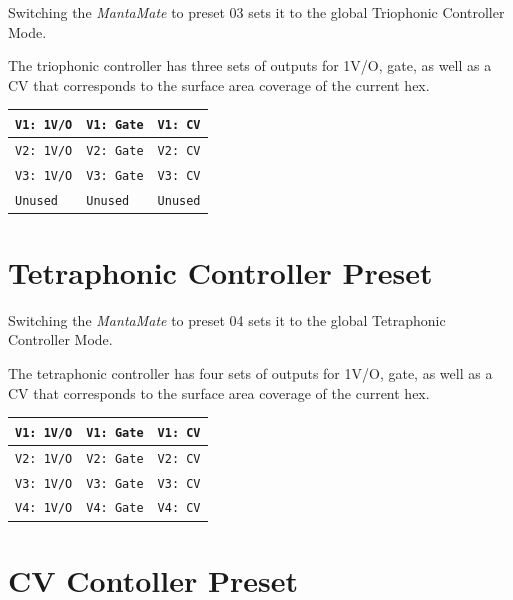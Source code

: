   Switching the \emph{MantaMate} to preset 03 sets it to the global
  Triophonic Controller Mode.

  The triophonic controller has three sets of outputs for 1V/O, gate, as well
  as a CV that corresponds to the surface area coverage of the current
  hex.

  \begin{center}
  \begin{tabular}{ | m{1.5cm} | m{1.5cm}| m{1.5cm} | }
    \hline
    \texttt{V1: 1V/O} & \texttt{V1: Gate} & \texttt{V1: CV} \\
    \hline
    \texttt{V2: 1V/O} & \texttt{V2: Gate} & \texttt{V2: CV} \\
    \hline
    \texttt{V3: 1V/O} & \texttt{V3: Gate} & \texttt{V3: CV} \\
    \hline
    \texttt{Unused} & \texttt{Unused} & \texttt{Unused} \\
    \hline
  \end{tabular}
  \end{center}


\section{Tetraphonic Controller Preset}

  Switching the \emph{MantaMate} to preset 04 sets it to the global
  Tetraphonic Controller Mode.

  The tetraphonic controller has four sets of outputs for 1V/O, gate, as well
  as a CV that corresponds to the surface area coverage of the current
  hex.

  \begin{center}
  \begin{tabular}{ | m{1.5cm} | m{1.5cm}| m{1.5cm} | }
    \hline
    \texttt{V1: 1V/O} & \texttt{V1: Gate} & \texttt{V1: CV} \\
    \hline
    \texttt{V2: 1V/O} & \texttt{V2: Gate} & \texttt{V2: CV} \\
    \hline
    \texttt{V3: 1V/O} & \texttt{V3: Gate} & \texttt{V3: CV} \\
    \hline
    \texttt{V4: 1V/O} & \texttt{V4: Gate} & \texttt{V4: CV} \\
    \hline
  \end{tabular}
  \end{center}

\section{CV Contoller Preset}

